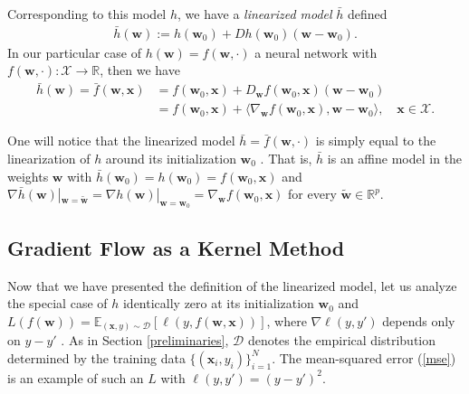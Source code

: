 \documentclass{article}
\begin{document}
Corresponding to this model $h$, we have a \textit{linearized model} $\bar{h}$ defined
\begin{align}
    \bar{h}(\boldsymbol{w}) := h(\boldsymbol{w}_0) + Dh(\boldsymbol{w}_0)(\boldsymbol{w}-\boldsymbol{w}_0).\label{linearizedmodel}
\end{align}
In our particular case of $h(\boldsymbol{w}) = f(\boldsymbol{w}, \cdot)$ a neural network with $f(\boldsymbol{w}, \cdot): \mathcal{X} \rightarrow \mathbb{R}$, then we have
\begin{align}
    \bar{h}(\boldsymbol{w}) = \bar{f}(\boldsymbol{w}, \boldsymbol{x}) &=  f(\boldsymbol{w}_0, \boldsymbol{x}) + D_{\boldsymbol{w}}f(\boldsymbol{w}_0, \boldsymbol{x})(\boldsymbol{w}-\boldsymbol{w}_0) \nonumber\\ 
    &= f(\boldsymbol{w}_0, \boldsymbol{x}) + \langle \nabla_{\boldsymbol{w}} f(\boldsymbol{w}_0, \boldsymbol{x}), \boldsymbol{w}-\boldsymbol{w}_0\rangle, \quad \boldsymbol{x} \in \mathcal{X}.\label{linearizedmodelnetwork}
\end{align}

One will notice that the linearized model $\bar{h} = \bar{f}(\boldsymbol{w}, \cdot)$ is simply equal to the linearization of $h$ around its initialization $\boldsymbol{w}_0$ \cite{chizat2018lazy}. That is, $\bar{h}$ is an affine model in the weights $\boldsymbol{w}$ with $\bar{h}(\boldsymbol{w}_0) = h(\boldsymbol{w}_0) = f(\boldsymbol{w}_0, \boldsymbol{x})$ and $\nabla \bar{h}(\boldsymbol{w})|_{\boldsymbol{w} = \boldsymbol{\tilde{w}}} = \nabla h(\boldsymbol{w})|_{\boldsymbol{w} = \boldsymbol{w}_0} = \nabla_{\boldsymbol{w}} f(\boldsymbol{w}_0, \boldsymbol{x})$ for every $\boldsymbol{\tilde{w}} \in \mathbb{R}^p$. 

\subsection{Gradient Flow as a Kernel Method}\label{kernelmethod}

Now that we have presented the definition of the linearized model, let us analyze the special case of $h$ identically zero at its initialization $\boldsymbol{w}_0$ and $L(f(\boldsymbol{w})) = \mathbb{E}_{(\boldsymbol{x}, y) \sim \mathcal{D}} [\ell(y, f(\boldsymbol{w}, \boldsymbol{x}))]$, where $\nabla \ell(y, y')$ depends only on $y - y'$ \cite{chizat2018note}. As in Section \ref{preliminaries}, $\mathcal{D}$ denotes the empirical distribution determined by the training data $\{ (\boldsymbol{x}_i, y_i) \}_{i=1}^N$. The mean-squared error (\ref{mse}) is an example of such an $L$ with $\ell(y, y') = (y - y')^2$. 
\end{document}
